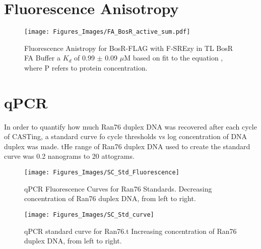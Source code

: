 \documentclass[12pt,twoside]{reedthesis}
\begin{document}
   \section{Fluorescence Anisotropy}
           	\begin{figure}[h]
           		\centering
           		\texttt{[image: Figures\_Images/FA\_BosR\_active\_sum.pdf]}
           		\caption[Determining Activity of BosR-FLAG by Fluorescence Anistropy]{Fluorescence Anistropy for BosR-FLAG with F-SREzy in TL BosR FA Buffer  a $K_{d}$ of 0.99 $\pm$ 0.09 $\mu$M based on fit to the equation \FAstdfit , where P refers to protein concentration.}
           		\label{BosRFLAGFAactive}
           	\end{figure}
           	
           	\section{qPCR}
           	
           	
           	In order to quantify how much Ran76 duplex DNA was recovered after each cycle of CASTing, a standard curve fo cycle thresholds vs log concentration of DNA duplex was made. tHe range of Ran76 duplex DNA used to create the standard curve was 0.2 nanograms to 20 attograms. 
       		 \begin{figure}[h!tbp]
       		 	\centering
       		 	\texttt{[image: Figures\_Images/SC\_Std\_Fluorescence]}
       		 	\caption[qPCR Fluorescence Curves for Ran76 Standards]{qPCR Fluorescence Curves for Ran76 Standards. Decreasing concentration of Ran76 duplex DNA, from left to right.}
       		 	\label{qPCRRan76Stds}
       		 \end{figure}
       		 
       		 
       		     		 \begin{figure}[h!tbp]
       		     		 	\centering
       		     		 	\texttt{[image: Figures\_Images/SC\_Std\_curve]}
       		     		 	\caption[qPCR Standard Curves for Ran76 Amplification]{qPCR standard curve for Ran76.t Increasing concentration of Ran76 duplex DNA, from left to right.}
       		     		 	\label{qPCRRan76Stdcurve}
       		     		 \end{figure}
           	
\end{document}
